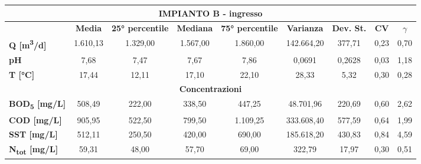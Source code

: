 \begin{sidewaystable}[h]
	\scriptsize
	\begin{center}
	\begin{tabular}{l|c|c|c|c|c|c|c|c|}
		\hline
		\multicolumn{9}{|c|}{\textbf{IMPIANTO B - ingresso}}                                                                                                                                                       \\ \hline
		& \textbf{Media} & \textbf{25° percentile} & \textbf{Mediana} & \textbf{75° percentile} & \textbf{Varianza}  & \textbf{Dev. St.} & \textbf{CV} & \textbf{$\gamma$} \\ \hline
		\multicolumn{1}{|l|}{\textbf{Q {[}m\textsuperscript{3}/d{]}}}             & 1.610,13       & 1.329,00                & 1.567,00         & 1.860,00                 & 142.664,20    & 377,71     & 0,23        & 0,70           \\ \hline
			\multicolumn{1}{|l|}{\textbf{pH}}                       & 7,68           & 7,47                    & 7,67             & 7,86                    & 0,0691       & 0,2628     & 0,03        & 1,18           \\ \hline
		\multicolumn{1}{|l|}{\textbf{T {[}°C{]}}}              & 17,44          & 12,11                   & 17,10            & 22,10                   & 28,33        & 5,32       & 0,30        & 0,28           \\ \hline
		\multicolumn{9}{|c|}{\textbf{Concentrazioni}}                                                                                                                                                              \\ \hline
		\multicolumn{1}{|l|}{\textbf{BOD\textsubscript{5} {[}mg/L{]}}}          & 508,49         & 222,00                  & 338,50           & 447,25                  & 48.701,96    & 220,69     & 0,60        & 2,62           \\ \hline
		\multicolumn{1}{|l|}{\textbf{COD {[}mg/L{]}}}           & 905,95         & 522,50                  & 799,50           & 1.109,25                & 333.608,40   & 577,59     & 0,64        & 1,99           \\ \hline
		\multicolumn{1}{|l|}{\textbf{SST {[}mg/L{]}}}           & 512,11         & 250,50                  & 420,00           & 690,00                  & 185.618,20   & 430,83     & 0,84        & 4,59           \\ \hline
		\multicolumn{1}{|l|}{\textbf{N\textsubscript{tot} {[}mg/L{]}}}          & 59,31          & 48,00                   & 57,70            & 69,00                   & 322,79       & 17,97      & 0,30        & 0,51           \\ \hline

\end{tabular}
\end{center}
\end{sidewaystable}

